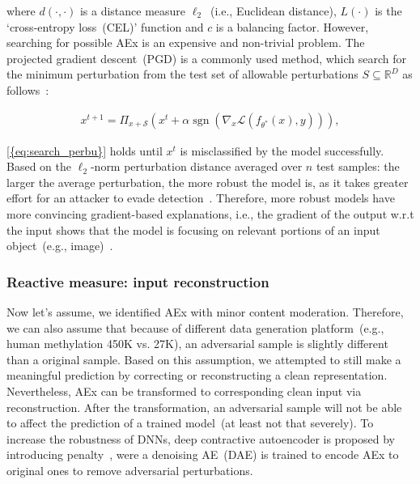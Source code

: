 where $d(\cdot, \cdot)$ is a distance measure $\ell_{2}$~(i.e., Euclidean distance), ${L}(\cdot)$ is the `cross-entropy loss~(CEL)' function and $c$ is a balancing factor. However, searching for possible AEx is an expensive and non-trivial problem. The projected gradient descent~(PGD) is a commonly used method, which search for the minimum perturbation from the test set of allowable perturbations ${S} \subseteq \mathbb{R}^{D}$ as follows~\cite{bhatt2020explainable}: 

\vspace{-6mm}
\begin{align}
    x^{t+1}=\Pi_{x+\mathcal{S}}\left(x^{t}+\alpha \operatorname{sgn}\left(\nabla_{x} \mathcal{L}\left(f_{\theta^{*}}(x), y\right)\right)\right),
    \label{eq:search_perbu}
\end{align}

\hspace*{3.5mm}\cref{{eq:search_perbu}} holds until $x^{t}$ is misclassified by the model successfully. Based on the $\ell_{2}$-norm perturbation distance averaged over $n$ test samples: the larger the average perturbation, the more robust the model is, as it takes greater effort for an attacker to evade detection~\cite{bhatt2020explainable,yuan2019adversarial}. 
Therefore, more robust models have more convincing gradient-based explanations, i.e., the gradient of the output w.r.t the input shows that the model is focusing on relevant portions of an input object~(e.g., image)~\cite{bhatt2020explainable}.

\subsubsection{Reactive measure: input reconstruction}
Now let's assume, we identified AEx with minor content moderation. Therefore, we can also assume that because of different data generation platform~(e.g., human methylation 450K vs. 27K), an adversarial sample is slightly different than a original sample. Based on this assumption, we attempted to still make a meaningful prediction by correcting or reconstructing a clean representation. Nevertheless, AEx can be transformed to corresponding clean input via reconstruction. After the transformation, an adversarial sample will not be able to affect the prediction of a trained model~(at least not that severely). 
To increase the robustness of DNNs, deep contractive autoencoder is proposed by introducing penalty~\cite{meng2017magnet}, were a denoising AE~(DAE) is trained to encode AEx to original ones to remove adversarial perturbations. 

